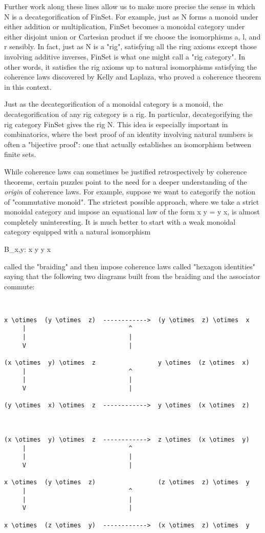 Further work along these lines allow us to make more precise the sense
in which N is a decategorification of FinSet.  For example, just as N
forms a monoid under either addition or multiplication, FinSet becomes
a monoidal category under either disjoint union or Cartesian product
if we choose the isomorphisms a, l, and r sensibly.  In fact, just as
N is a "rig", satisfying all the ring axioms except those involving
additive inverses, FinSet is what one might call a "rig category".  
In other words, it satisfies the rig axioms up to natural isomorphisms
satisfying the coherence laws discovered by Kelly and Laplaza, who
proved a coherence theorem in this context.  

Just as the decategorification of a monoidal category is a monoid, the
decategorification of any rig category is a rig.  In particular,
decategorifying the rig category FinSet gives the rig N.  This
idea is especially important in combinatorics, where the best proof of
an identity involving natural numbers is often a "bijective proof":
one that actually establishes an isomorphism between finite sets.

While coherence laws can sometimes be justified retrospectively by
coherence theorems, certain puzzles point to the need for a deeper
understanding of the \emph{origin} of coherence laws.   For example,
suppose we want to categorify the notion of "commutative monoid".   
The strictest possible approach, where we take a strict monoidal category
and impose an equational law of the form x \otimes  y = y \otimes  x, is
almost completely uninteresting.  It is much better to start with a weak
monoidal category equipped with a natural isomorphism 

B_{x,y}: x \otimes  y \to  y \otimes  x

called the "braiding"
and then impose coherence laws called "hexagon
identities" saying that the following two diagrams built from the
braiding and the associator commute:


\begin{verbatim}


x \otimes  (y \otimes  z)  ------------>  (y \otimes  z) \otimes  x 
     |                            ^
     |                            |
     V                            |

(x \otimes  y) \otimes  z                 y \otimes  (z \otimes  x)
     |                            ^
     |                            |
     V                            |

(y \otimes  x) \otimes  z  ------------>  y \otimes  (x \otimes  z)



(x \otimes  y) \otimes  z  ------------>  z \otimes  (x \otimes  y)
     |                            ^
     |                            |
     V                            |

x \otimes  (y \otimes  z)                 (z \otimes  z) \otimes  y
     |                            ^
     |                            |
     V                            |

x \otimes  (z \otimes  y)  ------------>  (x \otimes  z) \otimes  y

\end{verbatim}
    
